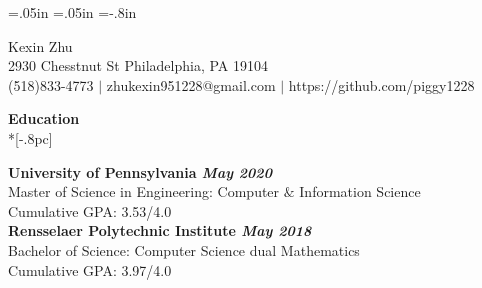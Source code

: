 \oddsidemargin=.05in
\evensidemargin=.05in
\textwidth=6in
\topmargin=-.8in
\textheight=9in
\parindent=0in
\pagestyle{empty}

\newenvironment{list1}{
  \begin{list}{\ding{113}}{%
      \setlength{\itemsep}{0in}
      \setlength{\parsep}{0in} \setlength{\parskip}{0in}
      \setlength{\topsep}{0in} \setlength{\partopsep}{0in}
      \setlength{\leftmargin}{0.17in}}}{\end{list}}
\newenvironment{list2}{
  \begin{list}{$\bullet$}{%
      \setlength{\itemsep}{0in}
      \setlength{\parsep}{0in} \setlength{\parskip}{0in}
      \setlength{\topsep}{0in} \setlength{\partopsep}{0in}
      \setlength{\leftmargin}{0.2in}}}{\end{list}}

\vspace*{-.05in}


\begin{center}
{\Large Kexin Zhu} \\[.5pc]

2930 Chesstnut St Philadelphia, PA 19104\\
(518)833-4773 $|$ zhukexin951228@gmail.com $|$ https://github.com/piggy1228  \\
\end{center}



{\large \bf Education} \\*[-.8pc]
\underline{\hspace{6in}} 

{\bf University of Pennsylvania \hfill \it May 2020 }\\
\rm Master of Science in Engineering:  Computer $\&$ Information Science \rm \\
Cumulative GPA: 3.53/4.0\rm\\

{\bf Rensselaer Polytechnic Institute \hfill \it May 2018 }\\
Bachelor of Science:  Computer Science  dual  Mathematics \rm \\
\rm Cumulative GPA: 3.97/4.0   \\
%




